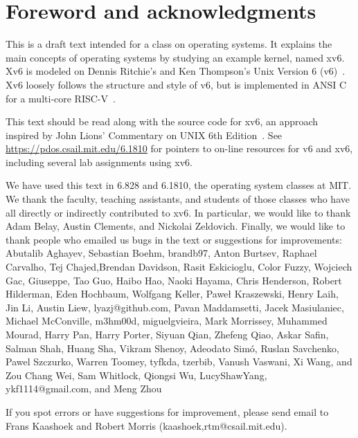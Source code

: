 \chapter*{Foreword and acknowledgments}


This is a draft text intended for a class on operating systems. It
explains the main concepts of operating systems by studying an example
kernel, named xv6.  Xv6 is modeled on Dennis Ritchie's and
Ken Thompson's Unix Version 6 (v6)~\cite{unix}.  Xv6 loosely follows the structure
and style of v6, but is implemented in ANSI C~\cite{kernighan} for 
a multi-core RISC-V~\cite{riscv}.

This text should be read along with the source code for xv6, an approach 
inspired by John Lions' Commentary on UNIX 6th Edition~\cite{lions}. See
\url{https://pdos.csail.mit.edu/6.1810} for pointers to on-line
resources for v6 and xv6, including several lab assignments
using xv6.

We have used this text in 6.828 and 6.1810, the operating system
classes at MIT.  We thank the faculty, teaching assistants, and
students of those classes who have all directly or indirectly
contributed to xv6.  In particular, we would like to thank Adam Belay,
Austin Clements, and Nickolai Zeldovich.  Finally, we would like to
thank people who emailed us bugs in the text or suggestions for
improvements: Abutalib Aghayev, Sebastian Boehm, brandb97, Anton
Burtsev, Raphael Carvalho, Tej Chajed,Brendan Davidson, Rasit
Eskicioglu, Color Fuzzy, Wojciech Gac, Giuseppe, Tao Guo, Haibo Hao,
Naoki Hayama, Chris Henderson, Robert Hilderman, Eden Hochbaum,
Wolfgang Keller, Paweł Kraszewski, Henry Laih, Jin Li, Austin Liew,
lyazj@github.com, Pavan Maddamsetti, Jacek Masiulaniec, Michael
McConville, m3hm00d, miguelgvieira, Mark Morrissey, Muhammed Mourad,
Harry Pan, Harry Porter, Siyuan Qian, Zhefeng Qiao, Askar Safin,
Salman Shah, Huang Sha, Vikram Shenoy, Adeodato Simó, Ruslan
Savchenko, Pawel Szczurko, Warren Toomey, tyfkda, tzerbib, Vanush
Vaswani, Xi Wang, and Zou Chang Wei, Sam Whitlock, Qiongsi Wu,
LucyShawYang, ykf1114@gmail.com, and Meng Zhou

If you spot errors or have suggestions for improvement, please send email to
Frans Kaashoek and Robert Morris (kaashoek,rtm@csail.mit.edu).
